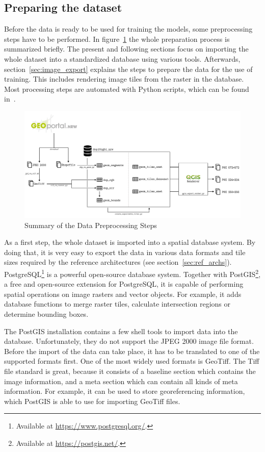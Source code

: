 \subsection{Preparing the dataset}
Before the data is ready to be used for training the models, some preprocessing steps have to be performed. In figure~\ref{fig:data_preprocessing} the whole preparation process is summarized briefly. The present and following sections focus on importing the whole dataset into a standardized database using various tools. Afterwards, section~\ref{sec:image_export} explains the steps to prepare the data for the use of training. This includes rendering image tiles from the raster in the database. Most processing steps are automated with Python scripts, which can be found in~\cite{thesis-code20}.

\begin{figure}[h]
    \centering
    \includegraphics[width=\textwidth]{images/data_preprocessing}
    \caption{Summary of the Data Preprocessing Steps}
    \label{fig:data_preprocessing}
\end{figure}

As a first step, the whole dataset is imported into a spatial database system. By doing that, it is very easy to export the data in various data formats and tile sizes required by the reference architectures (see section~\ref{sec:ref_archs}). PostgreSQL\footnote{Available at \url{https://www.postgresql.org/}.} is a powerful open-source database system. Together with PostGIS\footnote{Available at \url{https://postgis.net/}.}, a free and open-source extension for PostgreSQL, it is capable of performing spatial operations on image rasters and vector objects. For example, it adds database functions to merge raster tiles, calculate intersection regions or determine bounding boxes.

The PostGIS installation contains a few shell tools to import data into the database. Unfortunately, they do not support the JPEG 2000 image file format. Before the import of the data can take place, it has to be translated to one of the supported formats first. One of the most widely used formats is GeoTiff. The Tiff file standard is great, because it consists of a baseline section which contains the image information, and a meta section which can contain all kinds of meta information. For example, it can be used to store georeferencing information, which PostGIS is able to use for importing GeoTiff files.

